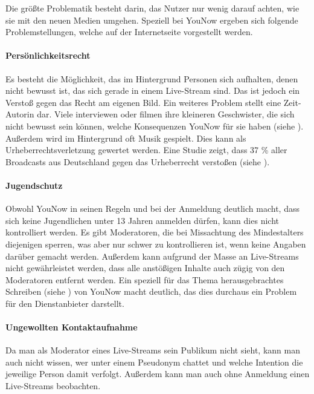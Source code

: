 Die größte Problematik besteht darin, das Nutzer nur wenig darauf achten, wie sie mit den neuen Medien umgehen. Speziell bei YouNow ergeben sich folgende Problemstellungen, welche auf der Internetseite \cite{KS15} vorgestellt werden.


\paragraph{Persönlichkeitsrecht}
Es besteht die Möglichkeit, das im Hintergrund Personen sich aufhalten, denen nicht bewusst ist, das sich gerade in einem Live-Stream sind. Das ist jedoch ein Verstoß gegen das Recht am eigenen Bild. Ein weiteres Problem stellt eine Zeit-Autorin dar. Viele interviewen oder filmen ihre kleineren Geschwister, die sich nicht bewusst sein können, welche Konsequenzen YouNow für sie haben (siehe \cite{ZEIT15}).
Außerdem wird im Hintergrund oft Musik gespielt. Dies kann als Urheberrechtsverletzung gewertet werden. Eine Studie zeigt, dass 37 \% aller Broadcasts aus Deutschland gegen das Urheberrecht verstoßen (siehe \cite{HFMNF15}).

\paragraph{Jugendschutz}
Obwohl YouNow in seinen Regeln und bei der Anmeldung deutlich macht, dass sich keine Jugendlichen unter 13 Jahren anmelden dürfen, kann dies nicht kontrolliert werden. Es gibt Moderatoren, die bei Missachtung des Mindestalters diejenigen sperren, was aber nur schwer zu kontrollieren ist, wenn keine Angaben darüber gemacht werden. Außerdem kann aufgrund der Masse an Live-Streams nicht gewährleistet werden, dass alle anstößigen Inhalte auch zügig von den Moderatoren entfernt werden. Ein speziell für das Thema herausgebrachtes Schreiben (siehe \cite{YTD15}) von YouNow macht deutlich, das dies durchaus ein Problem für den Dienstanbieter darstellt. 

\paragraph{Ungewollten Kontaktaufnahme}
Da man als Moderator eines Live-Streams sein Publikum nicht sieht, kann man auch nicht wissen, wer unter einem Pseudonym chattet und welche Intention die jeweilige Person damit verfolgt. Außerdem kann man auch ohne Anmeldung einen Live-Streams beobachten.


